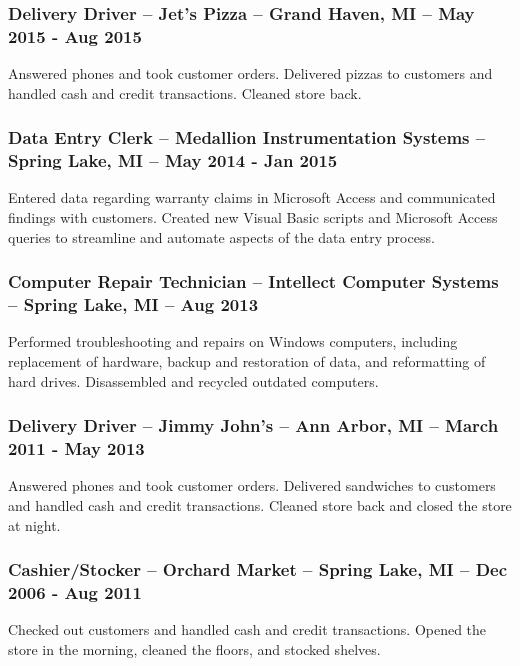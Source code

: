 \documentclass{article}
\begin{document}
		\subsubsection{Delivery Driver -- Jet’s Pizza -- Grand Haven, MI -- May 2015 - Aug 2015}
			\begin{addmargin}[1em]{0em}
				Answered phones and took customer orders. Delivered pizzas to customers and handled cash and credit transactions. Cleaned store back.
			\end{addmargin}

		\subsubsection{Data Entry Clerk -- Medallion Instrumentation Systems -- Spring Lake, MI -- May 2014 - Jan 2015}
			\begin{addmargin}[1em]{0em}
				Entered data regarding warranty claims in Microsoft Access and communicated findings with customers. Created new Visual Basic scripts and Microsoft Access queries to streamline and automate aspects of the data entry process.
			\end{addmargin}

		\subsubsection{Computer Repair Technician -- Intellect Computer Systems -- Spring Lake, MI -- Aug 2013}
			\begin{addmargin}[1em]{0em}
				Performed troubleshooting and repairs on Windows computers, including replacement of hardware, backup and restoration of data, and reformatting of hard drives. Disassembled and recycled outdated computers.
			\end{addmargin}

		\subsubsection{Delivery Driver -- Jimmy John's -- Ann Arbor, MI -- March 2011 - May 2013}
			\begin{addmargin}[1em]{0em}
				Answered phones and took customer orders. Delivered sandwiches to customers and handled cash and credit transactions. Cleaned store back and closed the store at night.
			\end{addmargin}

		\subsubsection{Cashier/Stocker -- Orchard Market -- Spring Lake, MI -- Dec 2006 - Aug 2011}
			\begin{addmargin}[1em]{0em}
				Checked out customers and handled cash and credit transactions. Opened the store in the morning, cleaned the floors, and stocked shelves.
			\end{addmargin}
\end{document}
